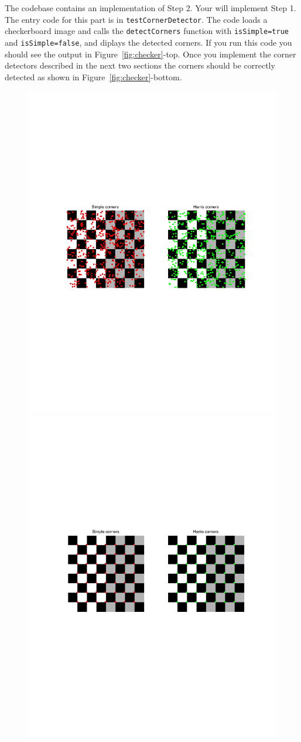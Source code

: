 \documentclass[10pt,letterpaper]{article}
\newcommand{\cmd}[1] {{\color{blue}\texttt{#1}}}
\begin{document}
The codebase contains an implementation of Step 2. Your will implement Step 1. The entry code for this part is in \cmd{testCornerDetector}. The code loads a checkerboard image and calls the \cmd{detectCorners} function with \cmd{isSimple=true} and \cmd{isSimple=false}, and diplays the detected corners. If you run this code you should see the output in Figure~\ref{fig:checker}-top. Once you implement the corner detectors described in the next two sections the corners should be correctly detected as shown in Figure~\ref{fig:checker}-bottom.


\begin{figure}[h]
\centering
\includegraphics[width=0.75\linewidth]{figs/checkerInit.pdf} \\
\includegraphics[width=0.75\linewidth]{figs/checkerSolution.pdf}

\end{figure}
\end{document}
